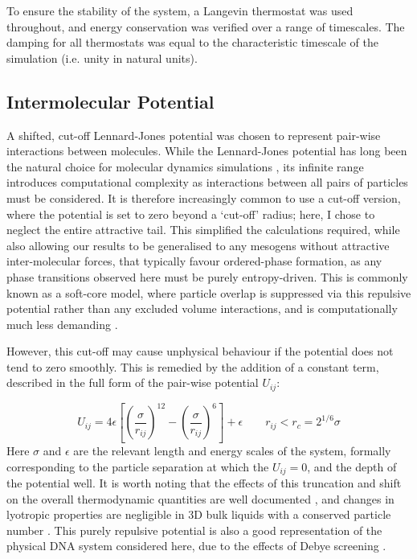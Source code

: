 \documentclass[11pt, a4paper]{article} %
\begin{document}
To ensure the stability of the system, a Langevin thermostat \cite{Schneider1978} was used throughout, and energy conservation was verified over a range of timescales. The damping for all thermostats was equal to the characteristic timescale of the simulation (i.e. unity in natural units).



\subsection{Intermolecular Potential} \label{pair_potential}
A shifted, cut-off Lennard-Jones potential was chosen to represent pair-wise interactions between molecules. While the Lennard-Jones potential \cite{Jones1924a, Jones1924b} has long been the natural choice for molecular dynamics simulations \cite{Stephan2019}, its infinite range introduces computational complexity as interactions between all pairs of particles must be considered. It is therefore increasingly common to use a cut-off version, where the potential is set to zero beyond a `cut-off' radius; here, I chose to neglect the entire attractive tail. This simplified the calculations required, while also allowing our results to be generalised to any mesogens without attractive inter-molecular forces, that typically favour ordered-phase formation, as any phase transitions observed here must be purely entropy-driven. This is commonly known as a soft-core model, where particle overlap is suppressed via this repulsive potential rather than any excluded volume interactions, and is computationally much less demanding \cite{Paolini1993, Hughes2008}.

However, this cut-off may cause unphysical behaviour if the potential does not tend to zero smoothly. This is remedied by the addition of a constant term, described in the full form of the pair-wise potential $U_{ij}$:

\begin{equation} \label{lj_cut}
U_{ij} = 4\epsilon \left[ \left( \frac{\sigma}{r_{ij}} \right) ^{12} - \left( \frac{\sigma}{r_{ij}} \right) ^{6}	\right] + \epsilon \qquad	 r_{ij} < r_{c} = 2^{1/6} \sigma
\end{equation} Here $\sigma$ and $\epsilon$ are the relevant length and energy scales of the system, formally corresponding to the particle separation at which the $U_{ij} = 0$, and the depth of the potential well. It is worth noting that the effects of this truncation and shift on the overall thermodynamic quantities are well documented \cite{Stephan2020, Shaul2010}, and changes in lyotropic properties are negligible in 3D bulk liquids with a conserved particle number \cite{Smit1991}. This purely repulsive potential is also a good representation of the physical DNA system considered here, due to the effects of Debye screening \cite{Strey1997, Strey1998}.
\end{document}
